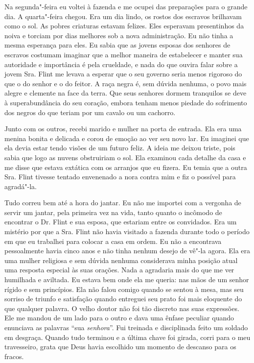 Na segunda"-feira eu voltei à fazenda e
me ocupei das preparações para o grande dia. A quarta"-feira chegou. Era
um dia lindo, os rostos dos escravos brilhavam como o sol. As pobres
criaturas estavam felizes. Eles esperavam presentinhos da noiva e
torciam por dias melhores sob a nova administração. Eu não tinha a mesma
esperança para eles. Eu sabia que as jovens esposas dos senhores de
escravos costumam imaginar que a melhor maneira de estabelecer e manter
sua autoridade e importância é pela crueldade, e nada do que ouvira
falar sobre a jovem Sra. Flint me levava a esperar que o seu governo
seria menos rigoroso do que o do senhor e o do feitor. A raça negra é,
sem dúvida nenhuma, o povo mais alegre e clemente na face da terra. Que
seus senhores dormem tranquilos se deve à superabundância do seu
coração, embora tenham menos piedade do sofrimento dos negros do que
teriam por um cavalo ou um cachorro.

Junto com os outros, recebi marido e
mulher na porta de entrada. Ela era uma menina bonita e delicada e corou
de emoção ao ver seu novo lar. Eu imaginei que ela devia estar tendo
visões de um futuro feliz. A ideia me deixou triste, pois sabia que logo
as nuvens obstruiriam o sol. Ela examinou cada detalhe da casa e me
disse que estava extática com os arranjos que eu fizera. Eu temia que a
outra Sra. Flint tivesse tentado envenenado a nora contra mim e fiz o
possível para agradá"-la.

Tudo correu bem até a hora do jantar.
Eu não me importei com a vergonha de servir um jantar, pela primeira vez
na vida, tanto quanto o incômodo de encontrar o Dr. Flint e sua esposa,
que estariam entre os convidados. Era um mistério por que a Sra. Flint
não havia visitado a fazenda durante todo o período em que eu trabalhei
para colocar a casa em ordem. Eu não a encontrava pessoalmente havia
cinco anos e não tinha nenhum desejo de vê"-la agora. Ela era uma mulher
religiosa e sem dúvida nenhuma considerava minha posição atual uma
resposta especial às suas orações. Nada a agradaria mais do que me ver
humilhada e aviltada. Eu estava bem onde ela me queria: nas mãos de um
senhor rígido e sem princípios. Ela não falou comigo quando se sentou à
mesa, mas seu sorriso de triunfo e satisfação quando entreguei seu prato
foi mais eloquente do que qualquer palavra. O velho doutor não foi tão
discreto nas suas expressões. Ele me mandou de um lado para o outro e
dava uma ênfase peculiar quando enunciava as palavras ``sua
\emph{senhora}''. Fui treinada e disciplinada feito um soldado em
desgraça. Quando tudo terminou e a última chave foi girada, corri para o
meu travesseiro, grata que Deus havia escolhido um momento de descanso
para os fracos.

